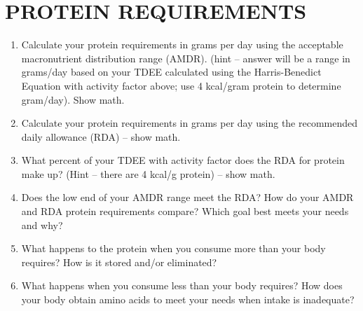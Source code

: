 \documentclass[
	title={Dietary Analysis Assignment - Nutrient Requirements},
	points={30}
]{fdsn201homework}
\begin{document}
\section{PROTEIN REQUIREMENTS}\label{sec:protein-requirements}
\begin{enumerate}[start=7]
	\item Calculate your protein requirements in grams per day using the acceptable macronutrient distribution range (AMDR).
	(hint – answer will be a range in grams/day based on your TDEE calculated using the Harris-Benedict Equation with activity factor above; use 4 kcal/gram protein to determine gram/day).
	Show math.
	\item Calculate your protein requirements in grams per day using the recommended daily allowance (RDA) – show math.
	\item What percent of your TDEE with activity factor does the RDA for protein make up?
	(Hint – there are 4 kcal/g protein) – show math.
	\item Does the low end of your AMDR range meet the RDA?
	How do your AMDR and RDA protein requirements compare?
	Which goal best meets your needs and why?
	\item What happens to the protein when you consume more than your body requires?
	How is it stored and/or eliminated?
	\item What happens when you consume less than your body requires?
	How does your body obtain amino acids to meet your needs when intake is inadequate?
\end{enumerate}
\end{document}
